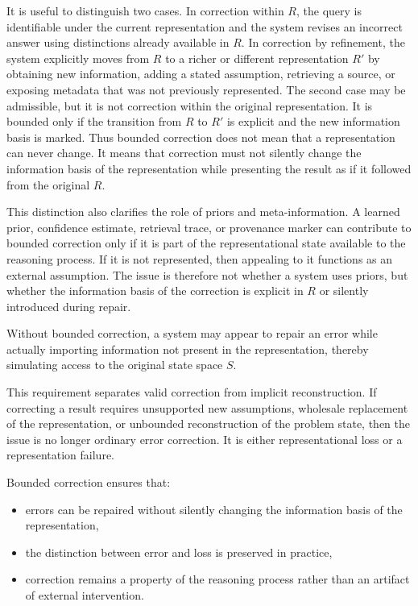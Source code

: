 \documentclass[11pt]{article}
\begin{document}
It is useful to distinguish two cases. In correction within $R$, the query is identifiable under the current representation and the system revises an incorrect answer using distinctions already available in $R$. In correction by refinement, the system explicitly moves from $R$ to a richer or different representation $R'$ by obtaining new information, adding a stated assumption, retrieving a source, or exposing metadata that was not previously represented. The second case may be admissible, but it is not correction within the original representation. It is bounded only if the transition from $R$ to $R'$ is explicit and the new information basis is marked. Thus bounded correction does not mean that a representation can never change. It means that correction must not silently change the information basis of the representation while presenting the result as if it followed from the original $R$.

This distinction also clarifies the role of priors and meta-information. A learned prior, confidence estimate, retrieval trace, or provenance marker can contribute to bounded correction only if it is part of the representational state available to the reasoning process. If it is not represented, then appealing to it functions as an external assumption. The issue is therefore not whether a system uses priors, but whether the information basis of the correction is explicit in $R$ or silently introduced during repair.

Without bounded correction, a system may appear to repair an error while actually importing information not present in the representation, thereby simulating access to the original state space $S$.

This requirement separates valid correction from implicit reconstruction. If correcting a result requires unsupported new assumptions, wholesale replacement of the representation, or unbounded reconstruction of the problem state, then the issue is no longer ordinary error correction. It is either representational loss or a representation failure.

Bounded correction ensures that:

\begin{itemize}[leftmargin=1.5em]
    \item errors can be repaired without silently changing the information basis of the representation,
    \item the distinction between error and loss is preserved in practice,
    \item correction remains a property of the reasoning process rather than an artifact of external intervention.
\end{itemize}
\end{document}
